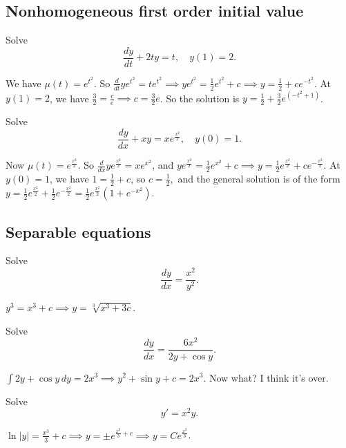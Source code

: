 \subsection{Nonhomogeneous first order initial value}
\begin{prob}
    Solve \[
        \frac{dy}{dt}+2ty=t,\quad y(1)=2.
    \] 
\end{prob}
\begin{solution}
    We have $\mu(t)=e^{t^2}$. So $\frac{d}{dt} y e^{t^2}=te^{t^2}\implies ye^{t^2}=\frac{1}{2}e^{t^2}+c\implies y=\frac{1}{2}+ce^{-t^2}.$ At $y(1)=2$, we have $\frac{3}{2}=\frac{c}{e}\implies c=\frac{3}{2}e$. So the solution is $y=\frac{1}{2}+\frac{3}{2}e^{(-t^2+1)}$.
\end{solution}
\begin{prob}
    Solve \[
        \frac{dy}{dx}+xy=xe^{\frac{x^2}{2}},\quad y(0)=1.
    \] 
\end{prob}
\begin{solution}
    Now $\mu(t)=e^{\frac{x^2}{2}}.$ So $\frac{d}{dx}ye^{\frac{x^2}{2}}=xe^{x^2}$, and $ye^{\frac{x^2}{2}}=\frac{1}{2}e^{x^2}+c\implies y=\frac{1}{2}e^{\frac{x^2}{2}}+ce^{-\frac{x^2}{2}}$. At $y(0)=1$, we have $1=\frac{1}{2}+c$, so $c=\frac{1}{2},$ and the general solution is of the form $y=\frac{1}{2}e^{\frac{x^2}{2}}+\frac{1}{2}e^{-\frac{x^2}{2}}=\frac{1}{2}e^{\frac{x^2}{2}}\left( 1+e^{-x^2} \right) $.
\end{solution}
\subsection{Separable equations}
\begin{prob}
    Solve \[
    \frac{dy}{dx}=\frac{x^2}{y^2}.
    \] 
\end{prob}
\begin{solution}
    $y^3=x^3+c\implies y=\sqrt[3]{x^3+3c} $.
\end{solution}
\begin{prob}
    Solve \[
    \frac{dy}{dx}=\frac{6x^2}{2y+\cos y}.
    \] 
\end{prob}
\begin{solution}
   $\int 2y+\cos y \, dy=2x^3\implies y^2+\sin y+c=2x^3$. Now what? I think it's over.
\end{solution}
\begin{prob}
    Solve  \[
    y'=x^2y.
    \] 
\end{prob}
\begin{solution}
    $\ln|y|=\frac{x^3}{3}+c\implies y=\pm e^{\frac{x^3}{3}+c}\implies y=Ce^{\frac{x^3}{3}}$.
\end{solution}

